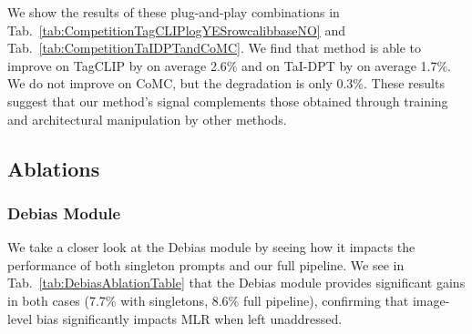 We show the results of these plug-and-play combinations in Tab.~\ref{tab:CompetitionTagCLIPlogYESrowcalibbaseNO} and Tab.~\ref{tab:CompetitionTaIDPTandCoMC}. We find that method is able to improve on TagCLIP by on average 2.6\% and on TaI-DPT by on average 1.7\%. We do not improve on CoMC, but the degradation is only 0.3\%. These results suggest that our method's signal complements those obtained through training and architectural manipulation by other methods.

\subsection{Ablations}

\subsubsection{Debias Module}


We take a closer look at the Debias module by seeing how it impacts the performance of both singleton prompts and our full pipeline. We see in Tab.~\ref{tab:DebiasAblationTable} that the Debias module provides significant gains in both cases (7.7\% with singletons, 8.6\% full pipeline), confirming that image-level bias significantly impacts MLR when left unaddressed. %

